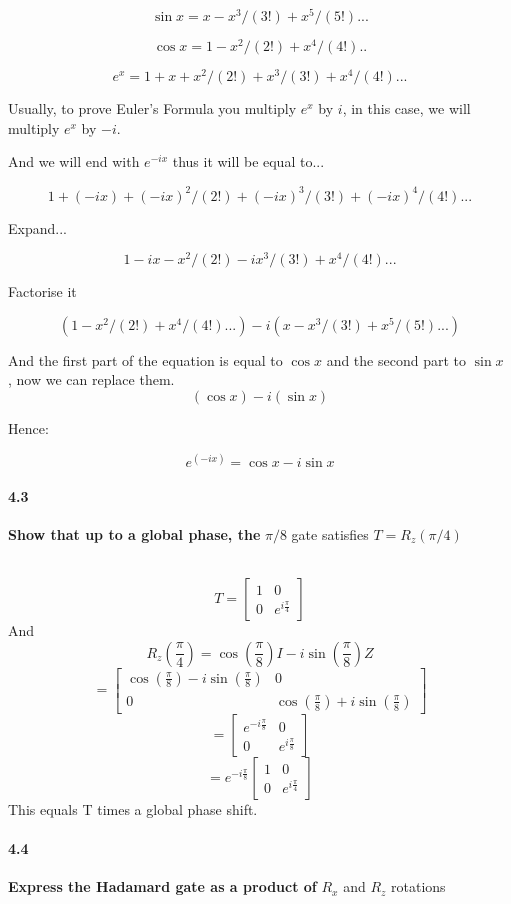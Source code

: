 $$ \sin x = x-x^3/(3!)+x^5/(5!)... $$

$$ \cos x = 1-x^2/(2!)+x^4/(4!)..$$

$$e^x = 1+x+x^2/(2!)+x^3/(3!)+x^4/(4!)...$$

Usually, to prove Euler's Formula you multiply $e^x$ by $i$, in this case, we will multiply 
$e^x$ by $ − i$.

And we will end with $e^{−ix}$ thus it will be equal to...

$$ 1+(-ix)+(-ix)^2/(2!)+(-ix)^3/(3!)+(-ix)^4/(4!)...$$

Expand...

$$1-ix-x^2/(2!)-ix^3/(3!)+x^4/(4!)...$$

Factorise it

$$(1-x^2/(2!)+x^4/(4!)...) -i(x-x^3/(3!)+x^5/(5!)...)
$$

And the first part of the equation is equal to 
$\cos x$
 and the second part to 
$\sin x$
, now we can replace them.
$$ (\cos x) -i(\sin x)
$$


Hence:

$$e^{(-ix)} = \cos x -i\sin x$$


\paragraph{4.3} \textbf{Show that up to a global phase, the } $\pi/8$ gate satisfies $T = R_z(\pi/4)$

\\

$$T = \begin{bmatrix}1 & 0\\0 & e^{i\frac{\pi}{4}} \end{bmatrix}$$
And
$$R_z(\frac{\pi}{4}) = \cos(\frac{\pi}{8})I - i\sin(\frac{\pi}{8})Z $$
$$= \begin{bmatrix} \cos(\frac{\pi}{8}) - i\sin(\frac{\pi}{8}) & 0\\0 & \cos(\frac{\pi}{8}) +i\sin(\frac{\pi}{8}) \end{bmatrix}$$ 
$$= \begin{bmatrix} e^{-i\frac{\pi}{8}} & 0\\0 & e^{i\frac{\pi}{8}} \end{bmatrix}$$ 
$$= e^{-i\frac{\pi}{8}} \begin{bmatrix} 1 & 0\\0 & e^{i\frac{\pi}{4}} \end{bmatrix}$$
This equals T times a global phase shift. 

\paragraph{4.4} \textbf{Express the Hadamard gate as a product of } $R_x$ and $R_z$ rotations
\\

